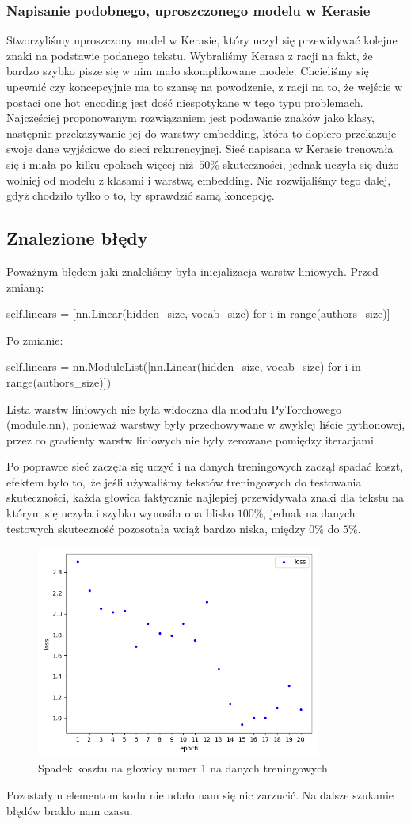 \subsubsection{Napisanie podobnego, uproszczonego modelu w Kerasie}
Stworzyliśmy uproszczony model w Kerasie, który uczył się przewidywać kolejne znaki na podstawie podanego tekstu. 
Wybraliśmy Kerasa z racji na fakt, że bardzo szybko pisze się w nim mało skomplikowane modele.
Chcieliśmy się upewnić czy koncepcyjnie ma to szansę na powodzenie, z racji na to, że wejście w postaci one hot encoding 
jest dość niespotykane w tego typu problemach. Najczęściej proponowanym rozwiązaniem jest podawanie znaków jako klasy, następnie 
przekazywanie jej do warstwy embedding, która to dopiero przekazuje swoje dane wyjściowe do sieci rekurencyjnej. 
Sieć napisana w Kerasie trenowała się i miała po kilku epokach więcej niż $50\%$ skuteczności, jednak uczyła się
dużo wolniej od modelu z klasami i warstwą embedding. Nie rozwijaliśmy tego dalej, gdyż chodziło tylko o to,
by sprawdzić samą koncepcję.

\newpage
\subsection{Znalezione błędy}
Poważnym błędem jaki znaleliśmy była inicjalizacja warstw liniowych.
Przed zmianą:
\begin{python}
self.linears = [nn.Linear(hidden_size, vocab_size) for i in range(authors_size)]

\end{python} 
Po zmianie:
\begin{python}
self.linears = nn.ModuleList([nn.Linear(hidden_size, vocab_size) for i in range(authors_size)])

\end{python} 

Lista warstw liniowych nie była widoczna dla modułu PyTorchowego (module.nn), ponieważ warstwy były przechowywane
w zwykłej liście pythonowej, przez co gradienty warstw liniowych nie były zerowane pomiędzy iteracjami.

Po poprawce sieć zaczęła się uczyć i na danych treningowych zaczął spadać koszt, efektem było to, że 
jeśli używaliśmy tekstów treningowych do testowania skuteczności, każda głowica faktycznie najlepiej przewidywała
znaki dla tekstu na którym się uczyła i szybko wynosiła ona blisko $100\%$, jednak na danych testowych 
skuteczność pozosotała wciąż bardzo niska, między $0\%$ do $5\%$.

\begin{figure}[H]
	\centering
	\includegraphics[height=7cm]{./images/loss_decrease.png}
	\caption{Spadek kosztu na głowicy numer 1 na danych treningowych}
	\label{fig:test5}
	\end{figure}

Pozostałym elementom kodu nie udało nam się nic zarzucić. Na dalsze szukanie błędów brakło nam czasu.
